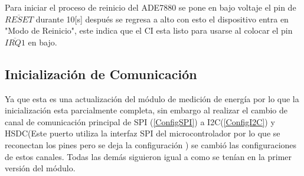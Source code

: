 \documentclass[letterpaper,12pt,oneside]{book}
\begin{document}
			Para iniciar el proceso de reinicio del ADE7880 se pone en bajo voltaje el pin de $\overline{RESET}$ durante 10[s] después se regresa a alto con esto el dispositivo entra en "Modo de Reinicio", este indica que el CI esta listo para usarse al colocar el pin $\overline{IRQ1}$ en bajo.
			\subsection{Inicialización de Comunicación}
			Ya que esta es una actualización del módulo de medición de energía por lo que la inicialización esta parcialmente completa, sin embargo al realizar el cambio de canal de comunicación principal de SPI (\ref{ConfigSPI}) a I2C(\ref{ConfigI2C}) y HSDC(Este puerto utiliza la interfaz SPI del microcontrolador por lo que se reconectan los pines pero se deja la configuración ) se cambió las configuraciones de estos canales. Todas las demás siguieron igual a como se tenían en la primer versión del módulo.
\end{document}
